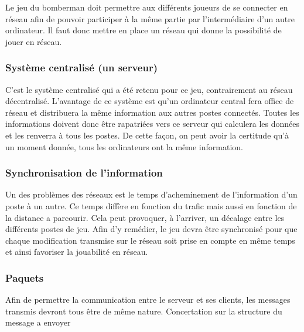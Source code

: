 Le jeu du bomberman doit permettre aux différents joueurs de se connecter en réseau afin de pouvoir participer à la même partie par l'intermédiaire d'un autre ordinateur. Il faut donc mettre en place un réseau qui donne la possibilité de jouer en réseau. 

\subsubsection{Système centralisé (un serveur)}
C'est le système centralisé qui a été retenu pour ce jeu, contrairement au réseau décentralisé. L'avantage de ce système est qu'un ordinateur central fera office de réseau et distribuera la même information aux autres postes connectés. Toutes les informations doivent donc être rapatriées vers ce serveur qui calculera les données et les renverra à tous les postes. De cette façon, on peut avoir la certitude qu'à un moment donnée, tous les ordinateurs ont la même information.

\subsubsection{Synchronisation de l'information}
Un des problèmes des réseaux est le temps d'acheminement de l'information d'un poste à un autre. Ce temps diffère en fonction du trafic mais aussi en fonction de la distance a parcourir. Cela peut provoquer, à l'arriver, un décalage entre les différents postes de jeu. Afin d'y remédier, le jeu devra être synchronisé pour que chaque modification transmise sur le réseau soit prise en compte en même temps et ainsi favoriser la jouabilité en réseau.

\subsubsection{Paquets}
Afin de permettre la communication entre le serveur et ses clients, les messages transmis devront tous être de même nature.
Concertation sur la structure du message a envoyer
